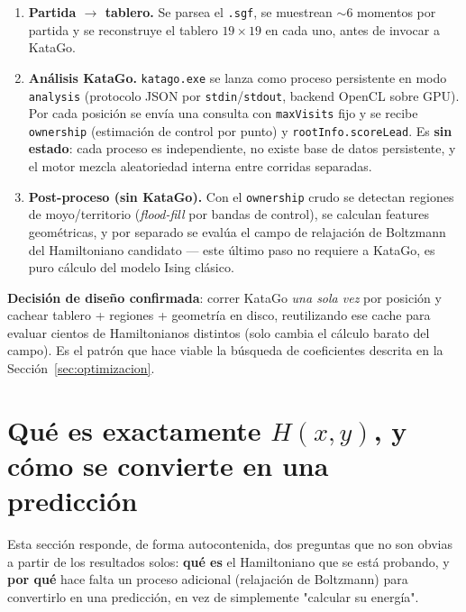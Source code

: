 \documentclass[11pt, a4paper]{article}
\begin{document}
\begin{enumerate}
  \item \textbf{Partida $\to$ tablero.} Se parsea el \texttt{.sgf}, se
  muestrean $\sim$6 momentos por partida y se reconstruye el tablero
  $19\times19$ en cada uno, antes de invocar a KataGo.

  \item \textbf{An\'alisis KataGo.} \texttt{katago.exe} se lanza como
  proceso persistente en modo \texttt{analysis} (protocolo JSON por
  \texttt{stdin}/\texttt{stdout}, backend OpenCL sobre GPU). Por cada
  posici\'on se env\'ia una consulta con \texttt{maxVisits} fijo y se
  recibe \texttt{ownership} (estimaci\'on de control por punto) y
  \texttt{rootInfo.scoreLead}. Es \textbf{sin estado}: cada proceso es
  independiente, no existe base de datos persistente, y el motor mezcla
  aleatoriedad interna entre corridas separadas.

  \item \textbf{Post-proceso (sin KataGo).} Con el \texttt{ownership}
  crudo se detectan regiones de moyo/territorio (\emph{flood-fill}
  por bandas de control), se calculan features geom\'etricas, y por
  separado se eval\'ua el campo de relajaci\'on de Boltzmann del
  Hamiltoniano candidato --- este \'ultimo paso no requiere a KataGo,
  es puro c\'alculo del modelo Ising cl\'asico.
\end{enumerate}

\begin{tcolorbox}[quotebox]
  \textbf{Decisi\'on de dise\~no confirmada}: correr KataGo \emph{una
  sola vez} por posici\'on y cachear tablero + regiones + geometr\'ia
  en disco, reutilizando ese cache para evaluar cientos de
  Hamiltonianos distintos (solo cambia el c\'alculo barato del campo).
  Es el patr\'on que hace viable la b\'usqueda de coeficientes descrita
  en la Secci\'on~\ref{sec:optimizacion}.
\end{tcolorbox}

\section{Qu\'e es exactamente $H(x,y)$, y c\'omo se convierte en una predicci\'on}
\label{sec:que-es-h}

Esta secci\'on responde, de forma autocontenida, dos preguntas que no
son obvias a partir de los resultados solos: \textbf{qu\'e es} el
Hamiltoniano que se est\'a probando, y \textbf{por qu\'e} hace falta un
proceso adicional (relajaci\'on de Boltzmann) para convertirlo en una
predicci\'on, en vez de simplemente "calcular su energ\'ia".
\end{document}
